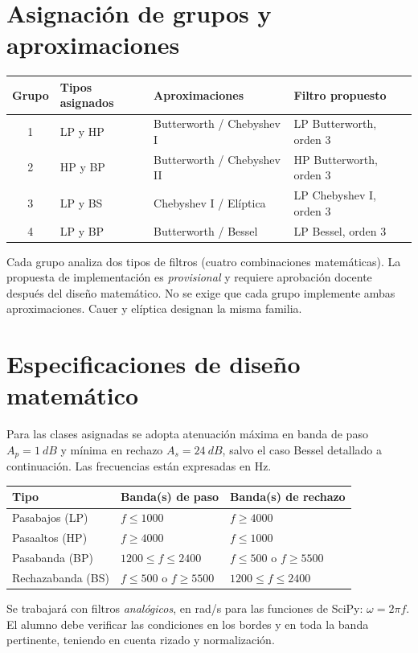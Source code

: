 \documentclass[11pt,a4paper]{article}
\begin{document}
\section{Asignación de grupos y aproximaciones}
\begin{center}\begin{tabular}{clll}\toprule
Grupo & Tipos asignados & Aproximaciones & Filtro propuesto\\\midrule
1 & LP y HP & Butterworth / Chebyshev I & LP Butterworth, orden 3\\
2 & HP y BP & Butterworth / Chebyshev II & HP Butterworth, orden 3\\
3 & LP y BS & Chebyshev I / Elíptica & LP Chebyshev I, orden 3\\
4 & LP y BP & Butterworth / Bessel & LP Bessel, orden 3\\\bottomrule
\end{tabular}\end{center}
Cada grupo analiza dos tipos de filtros (cuatro combinaciones matemáticas). La propuesta de implementación es \emph{provisional} y requiere aprobación docente después del diseño matemático. No se exige que cada grupo implemente ambas aproximaciones. Cauer y elíptica designan la misma familia.
\section{Especificaciones de diseño matemático}
Para las clases asignadas se adopta atenuación máxima en banda de paso $A_p=\SI{1}{dB}$ y mínima en rechazo $A_s=\SI{24}{dB}$, salvo el caso Bessel detallado a continuación. Las frecuencias están expresadas en Hz.
\begin{center}\begin{tabular}{lll}\toprule
Tipo & Banda(s) de paso & Banda(s) de rechazo\\\midrule
Pasabajos (LP) & $f\le 1000$ & $f\ge 4000$\\
Pasaaltos (HP) & $f\ge 4000$ & $f\le 1000$\\
Pasabanda (BP) & $1200\le f\le2400$ & $f\le500$ o $f\ge5500$\\
Rechazabanda (BS) & $f\le500$ o $f\ge5500$ & $1200\le f\le2400$\\\bottomrule
\end{tabular}\end{center}
Se trabajará con filtros \emph{analógicos}, en rad/s para las funciones de SciPy: $\omega=2\pi f$. El alumno debe verificar las condiciones en los bordes y en toda la banda pertinente, teniendo en cuenta rizado y normalización.
\end{document}
